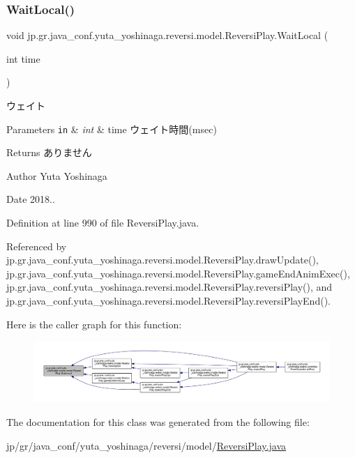 \subsubsection{\texorpdfstring{Wait\+Local()}{WaitLocal()}}
{\footnotesize\ttfamily void jp.\+gr.\+java\+\_\+conf.\+yuta\+\_\+yoshinaga.\+reversi.\+model.\+Reversi\+Play.\+Wait\+Local (\begin{DoxyParamCaption}\item[{int}]{time }\end{DoxyParamCaption})\hspace{0.3cm}{\ttfamily [private]}}



ウェイト 


\begin{DoxyParams}[1]{Parameters}
\mbox{\tt in}  & {\em int} & time ウェイト時間(msec) \\
\hline
\end{DoxyParams}
\begin{DoxyReturn}{Returns}
ありません 
\end{DoxyReturn}
\begin{DoxyAuthor}{Author}
Yuta Yoshinaga 
\end{DoxyAuthor}
\begin{DoxyDate}{Date}
2018.. 
\end{DoxyDate}


Definition at line 990 of file Reversi\+Play.\+java.



Referenced by jp.\+gr.\+java\+\_\+conf.\+yuta\+\_\+yoshinaga.\+reversi.\+model.\+Reversi\+Play.\+draw\+Update(), jp.\+gr.\+java\+\_\+conf.\+yuta\+\_\+yoshinaga.\+reversi.\+model.\+Reversi\+Play.\+game\+End\+Anim\+Exec(), jp.\+gr.\+java\+\_\+conf.\+yuta\+\_\+yoshinaga.\+reversi.\+model.\+Reversi\+Play.\+reversi\+Play(), and jp.\+gr.\+java\+\_\+conf.\+yuta\+\_\+yoshinaga.\+reversi.\+model.\+Reversi\+Play.\+reversi\+Play\+End().

Here is the caller graph for this function\+:
\nopagebreak
\begin{figure}[H]
\begin{center}
\leavevmode
\includegraphics[width=350pt]{classjp_1_1gr_1_1java__conf_1_1yuta__yoshinaga_1_1reversi_1_1model_1_1_reversi_play_aec398cf0d2ac7bd1d1b64be67bcadde2_icgraph}
\end{center}
\end{figure}


The documentation for this class was generated from the following file\+:\begin{DoxyCompactItemize}
\item 
jp/gr/java\+\_\+conf/yuta\+\_\+yoshinaga/reversi/model/\mbox{\hyperlink{_reversi_play_8java}{Reversi\+Play.\+java}}\end{DoxyCompactItemize}
